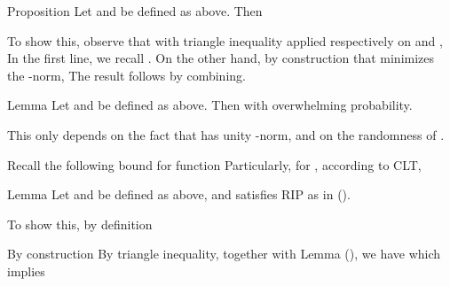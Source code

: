 \Result
{Proposition}
{
Let  and  be defined as above.
Then
}

To show this, observe that with triangle inequality applied respectively on  and ,
In the first line, we recall .
On the other hand, by construction that  minimizes the -norm,
The result follows by combining.

\Result
{Lemma}
{
Let  and  be defined as above.
Then
with overwhelming probability.
}

This only depends on the fact that  has unity -norm, and on the randomness of .

Recall the following bound for  function
Particularly, for , according to CLT,

\color[red]{(To be done)}

\Result
{Lemma}
{
Let  and  be defined as above, and  satisfies RIP as in ().
}

To show this, by definition

By construction
By triangle inequality, together with Lemma (), we have
which implies

